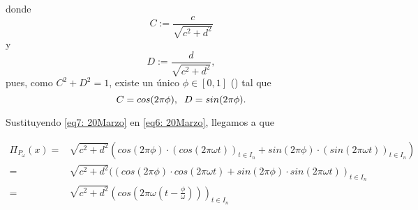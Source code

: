 donde
\[
C:= \frac{c}{\sqrt{c^{2}+d^{2}}}
\]
y 
\[
D:= \frac{d}{\sqrt{c^{2}+d^{2}}},
\]
pues, como $C^{2} + D^{2}=1$, existe un único
$\phi \in [0,1]$ () tal que
\begin{equation}
\label{eq7: 20Marzo}
C= cos(2 \pi \phi), \hspace{0.2cm} 
D= sin(2 \pi \phi).
\end{equation}

Sustituyendo \eqref{eq7: 20Marzo} en \eqref{eq6: 20Marzo},
llegamos a que

\begin{align*}
\Pi_{P_{\omega}}(x) = & 
\sqrt{c^{2}+d^{2}} \left(
cos(2 \pi \phi) \cdot (cos (2 \pi \omega t))_{t \in I_{n}} +
sin(2 \pi \phi) \cdot (sin (2 \pi \omega t))_{t \in I_{n}} 
\right) \\
= & 
\sqrt{c^{2}+d^{2}} 
((cos(2 \pi \phi) \cdot cos (2 \pi \omega t) +
sin(2 \pi \phi) \cdot sin (2 \pi \omega t) )_{t \in I_{n}} \\
= & 
\sqrt{c^{2}+d^{2}} 
\left(
cos \left( 2 \pi \omega \left( t - \frac{\phi}{\omega}
\right) 
\right) 
\right)_{t \in I_{n}}
\end{align*}